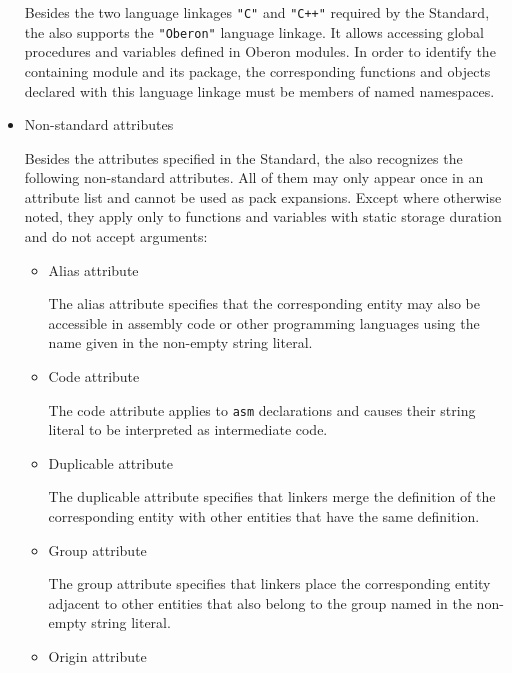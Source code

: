 \begin{itemize}
Besides the two language linkages \texttt{"C"} and \texttt{"C++"} required by the \cpp{} Standard, the \ecs{} also supports the \texttt{"Oberon"} language linkage.
It allows accessing global procedures and variables defined in Oberon modules.
In order to identify the containing module and its package, the corresponding functions and objects declared with this language linkage must be members of named namespaces.
\seeoberon

\item Non-standard attributes 

Besides the attributes specified in the \cpp{} Standard, the \ecs{} also recognizes the following non-standard attributes.
All of them may only appear once in an attribute list and cannot be used as pack expansions.
Except where otherwise noted, they apply only to functions and variables with static storage duration and do not accept arguments:

\begin{itemize}

\item Alias attribute\alignright{}\nopagebreak

The alias attribute specifies that the corresponding entity may also be accessible in assembly code or other programming languages using the name given in the non-empty string literal.

\item Code attribute\alignright{}\nopagebreak

The code attribute applies to \texttt{asm} declarations and causes their string literal to be interpreted as intermediate code.
\seecode

\item Duplicable attribute\alignright{}\nopagebreak

The duplicable attribute specifies that linkers merge the definition of the corresponding entity with other entities that have the same definition.

\item Group attribute\alignright{}\nopagebreak

The group attribute specifies that linkers place the corresponding entity adjacent to other entities that also belong to the group named in the non-empty string literal.

\item Origin attribute\alignright{}\nopagebreak


\end{itemize}
\end{itemize}
